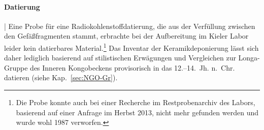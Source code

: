 \paragraph{Datierung}\hspace{-.5em}|\hspace{.5em}%
Eine Probe für eine Radiokohlenstoffdatierung, die aus der Verfüllung zwischen den Gefäßfragmenten stammt, erbrachte bei der Aufbereitung im Kieler Labor leider kein datierbares Material.\footnote{Die Probe konnte auch bei einer Recherche im Restprobenarchiv des Labors, basierend auf einer Anfrage im Herbst 2013, nicht mehr gefunden werden und wurde wohl 1987 verworfen.} Das Inventar der Keramikdeponierung lässt sich daher lediglich basierend auf stilistischen Erwägungen und Vergleichen zur Longa-Gruppe des Inneren Kongobeckens provisorisch in das 12.--14.~Jh. n.~Chr. datieren (siehe Kap.~\ref{sec:NGO-Gr}).